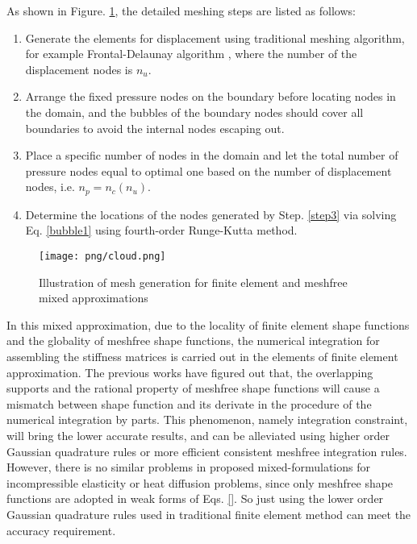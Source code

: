 As shown in Figure. \ref{fig:cloud}, the detailed meshing steps are listed as follows: 
\begin{enumerate}
    \item Generate the elements for displacement using traditional meshing algorithm, for example Frontal-Delaunay algorithm , where the number of the displacement nodes is $n_u$. 
    \item Arrange the fixed pressure nodes on the boundary before locating nodes in the domain, and the bubbles of the boundary nodes should cover all boundaries to avoid the internal nodes escaping out.
    \item Place a specific number of nodes in the domain and let the total number of pressure nodes equal to optimal one based on the number of displacement nodes, i.e. $n_p = n_c(n_u)$. \label{step3}
    \item Determine the locations of the nodes generated by Step. \ref{step3} via solving Eq. \eqref{bubble1} using fourth-order Runge-Kutta method.
\end{enumerate}

\begin{figure}[!ht]
\centering
\texttt{[image: png/cloud.png]}
\caption{Illustration of mesh generation for finite element and meshfree mixed approximations}\label{fig:cloud}
\end{figure}

In this mixed approximation, due to the locality of finite element shape functions and the globality of meshfree shape functions, the numerical integration for assembling the stiffness matrices is carried out in the elements of finite element approximation. 
The previous works have figured out that, the overlapping supports and the rational property of meshfree shape functions will cause a mismatch between shape function and its derivate in the procedure of the numerical integration by parts. This phenomenon, namely integration constraint, will bring the lower accurate results, and can be alleviated using higher order Gaussian quadrature rules or more efficient consistent meshfree integration rules. 
However, there is no similar problems in proposed mixed-formulations for incompressible elasticity or heat diffusion problems, since only meshfree shape functions are adopted in weak forms of Eqs. \eqref{}.
So just using the lower order Gaussian quadrature rules used in traditional finite element method can meet the accuracy requirement.
